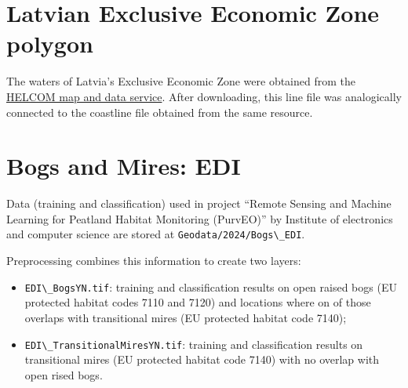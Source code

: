 \documentclass[
]{book}
\newcommand{\passthrough}[1]{#1}
\begin{document}
\section{Latvian Exclusive Economic Zone polygon}\label{Ch04.16}

The waters of Latvia's Exclusive Economic Zone were obtained from
the \href{https://maps.helcom.fi/website/mapservice/?datasetID=ae58c373-674c-45d1-be0f-1ff69a59f9ba}{HELCOM map and data service}. After downloading, this line file was
analogically connected to the coastline file obtained from the same resource.

\section{Bogs and Mires: EDI}\label{Ch04.17}

Data (training and classification) used in project ``Remote Sensing and Machine
Learning for Peatland Habitat Monitoring (PurvEO)'' by Institute of electronics
and computer science are stored at \passthrough{\lstinline!Geodata/2024/Bogs\_EDI!}.

Preprocessing combines this information to create two layers:

\begin{itemize}
\item
  \passthrough{\lstinline!EDI\_BogsYN.tif!}: training and classification results on open raised bogs (EU
  protected habitat codes 7110 and 7120) and locations where on of those overlaps
  with transitional mires (EU protected habitat code 7140);
\item
  \passthrough{\lstinline!EDI\_TransitionalMiresYN.tif!}: training and classification results on
  transitional mires (EU protected habitat code 7140) with no overlap with open
  rised bogs.
\end{itemize}
\end{document}
